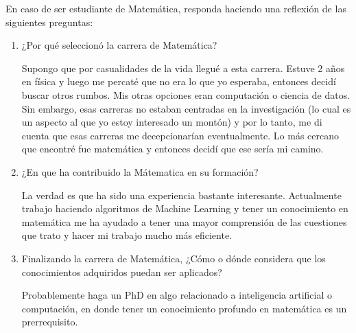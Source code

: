 \begin{problema}

En caso de ser estudiante de Matemática, responda haciendo una reflexión de las siguientes preguntas:
\begin{enumerate}
    \item ¿Por qué seleccionó la carrera de Matemática?
    \begin{sol}
        Supongo que por casualidades de la vida llegué a esta carrera. Estuve 2 años en física y luego me percaté que no era lo que yo esperaba, entonces decidí buscar otros rumbos. Mis otras opciones eran computación o ciencia de datos. Sin embargo, esas carreras no estaban centradas en la investigación (lo cual es un aspecto al que yo estoy interesado un montón) y por lo tanto, me di cuenta que esas carreras me decepcionarían eventualmente. Lo más cercano que encontré fue matemática y entonces decidí que ese sería mi camino. 
    \end{sol}
    \item ¿En que ha contribuido la Mátematica en su formación?
    \begin{sol}
        La verdad es que ha sido una experiencia bastante interesante. Actualmente trabajo haciendo algoritmos de Machine Learning y tener un conocimiento en matemática me ha ayudado a tener una mayor comprensión de las cuestiones que trato y hacer mi trabajo mucho más eficiente. 
    \end{sol}
    \item Finalizando la carrera de Matemática, ¿Cómo o dónde considera que los conocimientos adquiridos puedan ser aplicados?
    \begin{sol}
        Probablemente haga un PhD en algo relacionado a inteligencia artificial o computación, en donde tener un conocimiento profundo en matemática es un prerrequisito.  
    \end{sol}
\end{enumerate}


\end{problema}


%
%

